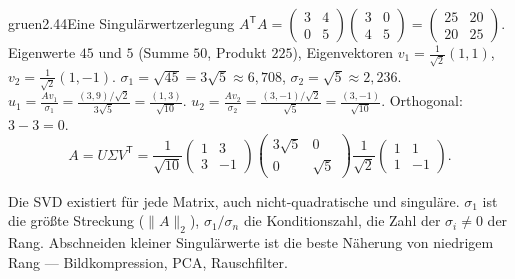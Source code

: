 \begin{loesungkarte}{gruen}{2.44}{Eine Singulärwertzerlegung}
$A^{\mathsf T}A = \begin{pmatrix}3 & 4\\ 0 & 5\end{pmatrix}\begin{pmatrix}3 & 0\\ 4 & 5\end{pmatrix} = \begin{pmatrix}25 & 20\\ 20 & 25\end{pmatrix}$. Eigenwerte $45$ und $5$ (Summe $50$, Produkt $225$), Eigenvektoren $v_1 = \frac1{\sqrt2}(1, 1)$, $v_2 = \frac1{\sqrt2}(1, -1)$.
$\sigma_1 = \sqrt{45} = 3\sqrt5\approx6{,}708$, $\sigma_2 = \sqrt5\approx2{,}236$.
$u_1 = \frac{Av_1}{\sigma_1} = \frac{(3, 9)/\sqrt2}{3\sqrt5} = \frac{(1, 3)}{\sqrt{10}}$. $u_2 = \frac{Av_2}{\sigma_2} = \frac{(3, -1)/\sqrt2}{\sqrt5} = \frac{(3, -1)}{\sqrt{10}}$. Orthogonal: $3 - 3 = 0$. \checkmark
\[ A = U\Sigma V^{\mathsf T} = \frac1{\sqrt{10}}\begin{pmatrix}1 & 3\\ 3 & -1\end{pmatrix}\begin{pmatrix}3\sqrt5 & 0\\ 0 & \sqrt5\end{pmatrix}\frac1{\sqrt2}\begin{pmatrix}1 & 1\\ 1 & -1\end{pmatrix}. \]
\begin{mitnehmen}\kastentext
Die SVD existiert für jede Matrix, auch nicht-quadratische und singuläre. $\sigma_1$ ist die größte Streckung ($\|A\|_2$), $\sigma_1/\sigma_n$ die Konditionszahl, die Zahl der $\sigma_i\neq0$ der Rang. Abschneiden kleiner Singulärwerte ist die beste Näherung von niedrigem Rang --- Bildkompression, PCA, Rauschfilter.
\end{mitnehmen}
\end{loesungkarte}

